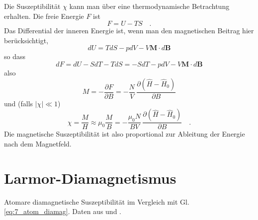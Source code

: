 Die Suszeptibilität $\chi$ kann man über eine thermodynamische Betrachtung erhalten. Die freie Energie $F$ ist
\begin{equation}
    F = U - T S \quad .
\end{equation}
Das Differential der inneren Energie ist, wenn man den magnetischen Beitrag hier berücksichtigt,
\begin{equation}
    dU = T dS - p dV - V \bm{M}\cdot d \bm{B}
\end{equation}
so dass
\begin{equation}
    dF = dU - S dT - T dS = -S dT - p dV - V \bm{M}\cdot d \bm{B}
\end{equation}
also 
\begin{equation}
    M  = - \frac{\partial F}{\partial B} = - \frac{N}{V} \, \frac{\partial (\hat{H} - \hat{H}_0)}{\partial B}
\end{equation}
und (falls $|\chi| \ll 1$)
\begin{equation}
    \chi = \frac{M}{H} \approx \mu_0 \frac{M}{B} = - \frac{\mu_0 N}{B V} \, \frac{\partial (\hat{H} - \hat{H}_0)}{\partial B} \quad .
\end{equation}
Die magnetische Suszeptibilität ist also proportional zur Ableitung der Energie nach dem Magnetfeld. 

\section*{Larmor-Diamagnetismus}


\begin{marginfigure}
    \caption{Atomare diamagnetische Suszeptibilität im Vergleich mit Gl. \ref{eq:7_atom_diamag}. Daten aus \cite{Gross_FK} und \cite{Blundell_magnetism}.
    }
\end{marginfigure}
    

